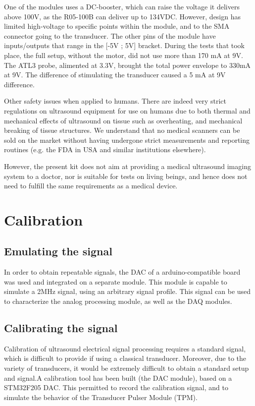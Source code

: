 \documentclass[letterpaper, 10 pt, conference]{ieeeconf} %
\begin{document}
One of the modules uses a DC-booster, which can raise the voltage it delivers above 100V, as the R05-100B can deliver up to 134VDC. However, design has limited high-voltage to specific points within the module, and to the SMA connector going to the transducer. The other pins of the module have inputs/outputs that range in the [-5V ; 5V] bracket. During the tests that took place, the full setup, without the motor, did not use more than 170 mA at 9V. The ATL3 probe, alimented at 3.3V, brought the total power envelope to 330mA at 9V. The difference of stimulating the transducer caused a 5 mA at 9V difference.

Other safety issues when applied to humans\cite{SafeUse}. There are indeed very strict regulations on ultrasound equipment for use on humans due to both thermal and mechanical effects of ultrasound on tissue such as overheating, and mechanical breaking of tissue structures. We understand that no medical scanners can be sold on the market without having undergone strict measurements and reporting routines (e.g. the FDA in USA and similar institutions elsewhere). 

However, the present kit does not aim at providing a medical ultrasound imaging system to a doctor, nor is suitable for tests on living beings, and hence does not need to fulfill the same requirements as a medical device. 


\section{Calibration}

\subsection{Emulating the signal}

In order to obtain repeatable signals, the DAC of a arduino-compatible board was used and integrated on a separate module. This module is capable to simulate a 2MHz signal, using an arbitrary signal profile. This signal can be used to characterize the analog processing module, as well as the DAQ modules. 

\subsection{Calibrating the signal}

Calibration of ultrasound electrical signal processing requires a standard signal, which is difficult to provide if using a classical transducer. Moreover, due to the variety of transducers, it would be extremely difficult to obtain a standard setup and signal.A calibration tool has been built (the DAC module), based on a STM32F205 DAC. This permitted to record the calibration signal, and to simulate the behavior of the Transducer Pulser Module (TPM).
\end{document}
